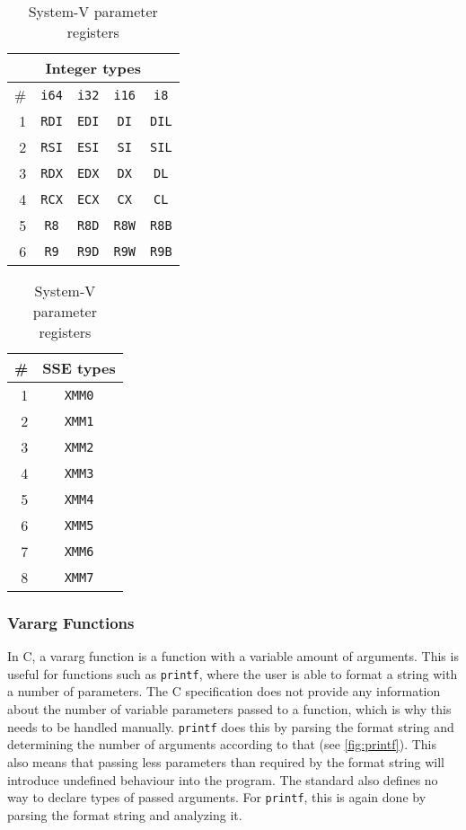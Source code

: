 \begin{table}[htpb]
    \centering
    \centering
    \begin{tabular}[t]{|r|c c c c|}
        \hline
        \multicolumn{5}{|c|}{Integer types} \\
        \hline
        \# & \texttt{i64} & \texttt{i32} & \texttt{i16} & \texttt{i8}  \\
        \hline
        1  & \texttt{RDI} & \texttt{EDI} & \texttt{DI}  & \texttt{DIL} \\
        2  & \texttt{RSI} & \texttt{ESI} & \texttt{SI}  & \texttt{SIL} \\
        3  & \texttt{RDX} & \texttt{EDX} & \texttt{DX}  & \texttt{DL}  \\
        4  & \texttt{RCX} & \texttt{ECX} & \texttt{CX}  & \texttt{CL}  \\
        5  & \texttt{R8}  & \texttt{R8D} & \texttt{R8W} & \texttt{R8B} \\
        6  & \texttt{R9}  & \texttt{R9D} & \texttt{R9W} & \texttt{R9B} \\
        \hline
    \end{tabular}
    \centering
    \begin{tabular}[t]{|r|c|}
        \hline
        \# & SSE types     \\
        \hline
        1  & \texttt{XMM0} \\
        2  & \texttt{XMM1} \\
        3  & \texttt{XMM2} \\
        4  & \texttt{XMM3} \\
        5  & \texttt{XMM4} \\
        6  & \texttt{XMM5} \\
        7  & \texttt{XMM6} \\
        8  & \texttt{XMM7} \\
        \hline
    \end{tabular}
    \caption{System-V parameter registers}\label{tab:param-regs}
\end{table}

\subsubsection{Vararg Functions}

In C, a vararg function is a function with a variable amount of arguments.
This is useful for functions such as \texttt{printf}, where the user is able to format a string with a number of parameters.
The C specification does not provide any information about the number of variable parameters passed to a function, which is why this needs to be handled manually.
\texttt{printf} does this by parsing the format string and determining the number of arguments according to that (see \cref{fig:printf}).
This also means that passing less parameters than required by the format string will introduce undefined behaviour into the program.
The standard also defines no way to declare types of passed arguments.
For \texttt{printf}, this is again done by parsing the format string and analyzing it.

